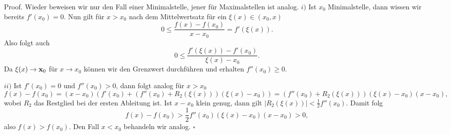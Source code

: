 \begin{emphBox}{}{}
Proof. Wieder beweisen wir nur den Fall einer Minimalstelle, jener für Maximalstellen ist analog.
\(i)\) Ist \(x_0\) Minimalstelle, dann wissen wir bereits \(f'(x_0) = 0\). Nun gilt für \(x > x_0\) nach dem Mittelwertsatz für ein \(\xi(x) \in (x_0,x)\)
\begin{equation*}
 0 \leq  \frac{f(x)-f(x_0)}{x-x_0} = f'(\xi(x)).
\end{equation*}
Also folgt auch
\begin{equation*}
 0 \leq \frac{f'(\xi(x)) - f'(x_0)}{\xi(x)-x_0}.
\end{equation*}
Da \(\xi(x) \rightarrow {\mathbf x}_0\) für \(x \rightarrow x_0\) können wir den Grenzwert durchführen und erhalten \(f''(x_0) \geq 0\).

\(ii)\) Ist \(f'(x_0) = 0\) und \(f''(x_0) > 0\), dann folgt analog für \(x > x_0\)
\begin{equation*}
 f(x) - f(x_0) = (x-x_0) ( f'(x_0) + (f''(x_0) + R_2(\xi(x)))(\xi(x)-x_0)) = (f''(x_0) + R_2(\xi(x)))(\xi(x)-x_0)(x-x_0),
\end{equation*}
wobei \(R_2\) das Restglied bei der ersten Ableitung ist. Ist \(x-x_0\) klein genug, dann gilt
\(|R_2(\xi(x))| < \frac{1}2 f''(x_0)\). Damit folg
\begin{equation*}
 f(x) - f(x_0) > \frac{1}2 f''(x_0) (\xi(x)-x_0)(x-x_0) > 0,
\end{equation*}
also \(f(x) > f(x_0)\). Den Fall \(x < x_0\) behandeln wir analog. \(\square\)
\end{emphBox}


